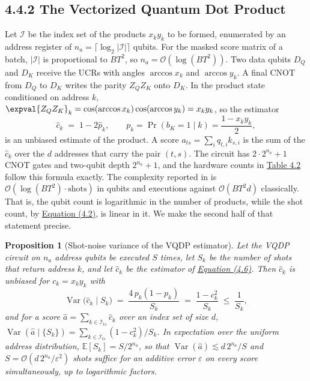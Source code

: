 \documentclass{report}
\theoremstyle{plain}
\newtheorem{proposition}[theorem]{Proposition}
\theoremstyle{definition}
\theoremstyle{remark}
\newcommand{\bigO}[1]{\mathcal{O}\!\left(#1\right)}
\newcommand{\eps}{\varepsilon}
\begin{document}
\subsection{4.4.2 The Vectorized Quantum Dot Product}\label{sec:qml:vqt:vqdp}

Let $\mathcal{I}$ be the index set of the products $x_k y_k$ to be formed, enumerated by an address register of $n_a = \lceil \log_2 |\mathcal{I}| \rceil$ qubits. For the masked score matrix of a batch, $|\mathcal{I}|$ is proportional to $BT^2$, so $n_a = \bigO{\log(BT^2)}$. Two data qubits $D_Q$ and $D_K$ receive the UCRs with angles $\arccos x_k$ and $\arccos y_k$. A final CNOT from $D_Q$ to $D_K$ writes the parity $Z_Q Z_K$ onto $D_K$. In the product state conditioned on address $k$, $\expval{Z_Q Z_K}_k = \cos(\arccos x_k)\cos(\arccos y_k) = x_k y_k$, so the estimator
\hypertarget{eq:qml:vqdp}{}\[
\hat{c}_k \;=\; 1 - 2\hat{p}_k, \qquad p_k = \Pr(b_K = 1 \mid k) = \frac{1 - x_k y_k}{2},
\tag{4.6}\]
is an unbiased estimate of the product. A score $a_{ts} = \sum_{i} q_{t,i} k_{s,i}$ is the sum of the $\hat{c}_k$ over the $d$ addresses that carry the pair $(t,s)$. The circuit has $2 \cdot 2^{n_a} + 1$ CNOT gates and two-qubit depth $2^{n_a} + 1$, and the hardware counts in \hyperref[tab:qml:vqt-hw]{Table 4.2} follow this formula exactly. The complexity reported in \cite{guo2025vqt} is $\bigO{\log(BT^2)\cdot \text{shots}}$ in qubits and executions against $\bigO{BT^2 d}$ classically. That is, the qubit count is logarithmic in the number of products, while the shot count, by \hyperref[eq:qml:readout]{Equation (4.2)}, is linear in it. We make the second half of that statement precise.

\begin{proposition}[Shot-noise variance of the VQDP estimator]\label{thm:qml:vqdp-variance}
Let the VQDP circuit on $n_a$ address qubits be executed $S$ times, let $S_k$ be the number of shots that return address $k$, and let $\hat{c}_k$ be the estimator of \hyperref[eq:qml:vqdp]{Equation (4.6)}. Then $\hat{c}_k$ is unbiased for $c_k = x_k y_k$ with
\hypertarget{eq:qml:vqdp-var}{}\[
\operatorname{Var}\big(\hat{c}_k \mid S_k\big) \;=\; \frac{4\,p_k(1-p_k)}{S_k} \;=\; \frac{1 - c_k^2}{S_k} \;\le\; \frac{1}{S_k},
\tag{4.7}\]
and for a score $\hat{a} = \sum_{k \in \mathcal{I}_{ts}} \hat{c}_k$ over an index set of size $d$,
$\operatorname{Var}(\hat{a} \mid \{S_k\}) = \sum_{k \in \mathcal{I}_{ts}} (1 - c_k^2)/S_k$. In expectation over the uniform address distribution, $\mathbb{E}[S_k] = S/2^{n_a}$, so that $\operatorname{Var}(\hat{a}) \lesssim d\,2^{n_a}/S$ and $S = \bigO{d\,2^{n_a}/\eps^2}$ shots suffice for an additive error $\eps$ on every score simultaneously, up to logarithmic factors.
\end{proposition}
\end{document}

